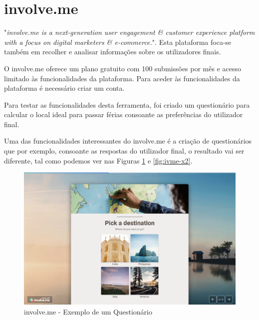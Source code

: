 \section{involve.me}
\label{involveme}


"\textit{involve.me is a next-generation user engagement \& customer experience platform with a focus on digital marketers \& e-commerce.}"\cite{involve}.
Esta plataforma foca-se também em recolher e analisar informações sobre os utilizadores finais.

O involve.me oferece um plano gratuito com 100 submissões por mês e acesso limitado às funcionalidades da plataforma. Para aceder às funcionalidades da plataforma é necessário criar um conta.

Para testar as funcionalidades desta ferramenta, foi criado um questionário para calcular o local ideal para passar férias consoante as preferências do utilizador final. 

\pagebreak

Uma das funcionalidades interessantes do involve.me é a criação de questionários que por exemplo, consoante as respostas do utilizador final, o resultado vai ser diferente, tal como podemos ver nas Figuras \ref{fig:ivme-x1} e \ref{fig:ivme-x2}.


\begin{figure}[ht!]
	\begin{center}
		\includegraphics[width=1\textwidth]{img/ivme/x1}
		\caption{involve.me - Exemplo de um Questionário}
		\label{fig:ivme-x1}
	\end{center}
\end{figure}

